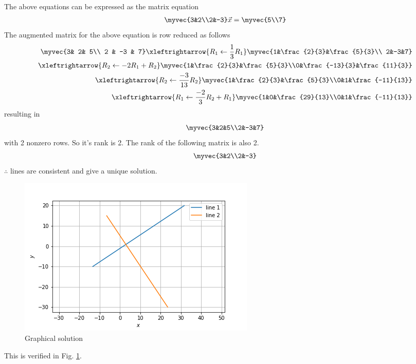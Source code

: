 
The above equations can be expressed as the matrix equation
\begin{align}
     \myvec{3&2\\2&-3}\vec{x}=\myvec{5\\7}
\end{align}
The augmented matrix for the above equation
is row reduced as follows
\begin{align}
     \myvec{3& 2& 5\\
           2 & -3 & 7}
          \xleftrightarrow{R_1 \leftarrow\frac{1}{3}{R_1}}
    \myvec{1&\frac{2}{3}&\frac{5}{3}\\
        2&-3&7}\\
        \xleftrightarrow{R_2\leftarrow  -2R_1+R_2}
    \myvec{1&\frac{2}{3}&\frac{5}{3}\\0&\frac{-13}{3}&\frac{11}{3}}\\
    \xleftrightarrow{R_2\leftarrow \frac{-3}{13}{R_2}}
    \myvec{1&\frac{2}{3}&\frac{5}{3}\\0&1&\frac{-11}{13}}\\
    \xleftrightarrow{R_1\leftarrow \frac{-2}{3}R_2+R_1}
    \myvec{1&0&\frac{29}{13}\\0&1&\frac{-11}{13}}
    \end{align}
resulting in 
 \begin{align}
     \myvec{3&2&5\\2&-3&7}
 \end{align}
with 2 nonzero rows. So it's rank is 2. The rank of the following matrix is also 2.
   \begin{align}
       \myvec{3&2\\2&-3}
   \end{align} 
   $\therefore$ lines are consistent and give a unique solution.
%
\begin{figure}[!ht]
\centering
    \includegraphics[width= \columnwidth]{solutions/sep/2/5/a/consistent.png}
    \caption{Graphical solution}
    \label{sep/2/5/a/Fig:Graphical Solution}
\end{figure}

This is verified in Fig.     \ref{sep/2/5/a/Fig:Graphical Solution}.
